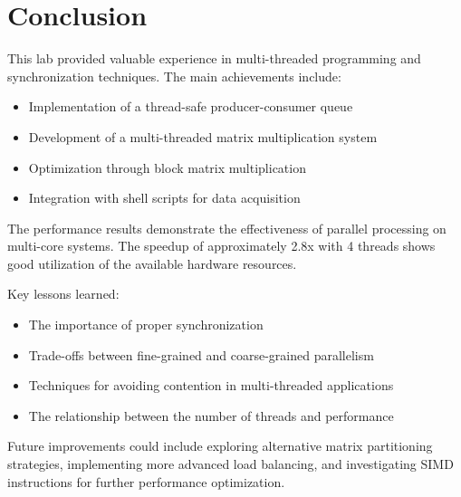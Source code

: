 \documentclass[11pt,a4paper]{article}
\begin{document}
\section{Conclusion}

This lab provided valuable experience in multi-threaded programming and synchronization techniques. The main achievements include:

\begin{itemize}
    \item Implementation of a thread-safe producer-consumer queue
    \item Development of a multi-threaded matrix multiplication system
    \item Optimization through block matrix multiplication
    \item Integration with shell scripts for data acquisition
\end{itemize}

The performance results demonstrate the effectiveness of parallel processing on multi-core systems. The speedup of approximately 2.8x with 4 threads shows good utilization of the available hardware resources.

Key lessons learned:
\begin{itemize}
    \item The importance of proper synchronization
    \item Trade-offs between fine-grained and coarse-grained parallelism
    \item Techniques for avoiding contention in multi-threaded applications
    \item The relationship between the number of threads and performance
\end{itemize}

Future improvements could include exploring alternative matrix partitioning strategies, implementing more advanced load balancing, and investigating SIMD instructions for further performance optimization.
\end{document}
